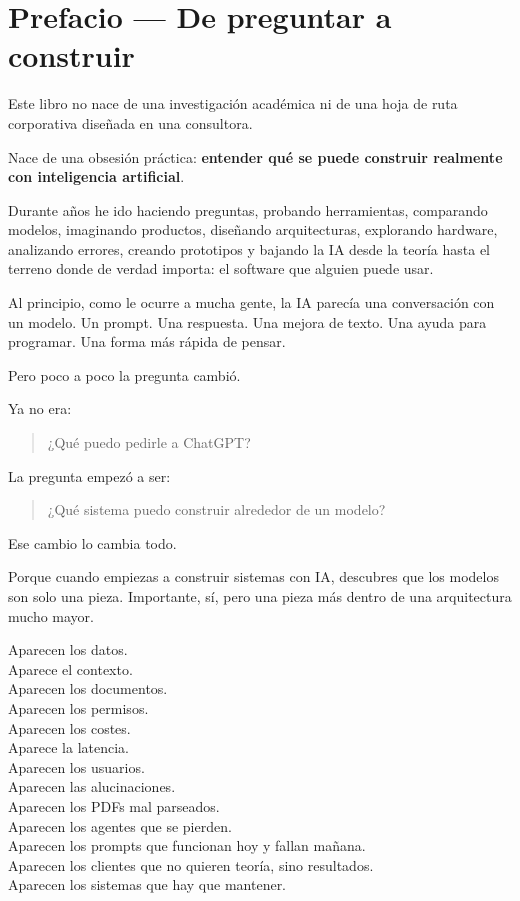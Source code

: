 \chapter{Prefacio --- De preguntar a
construir}\label{prefacio-de-preguntar-a-construir}

Este libro no nace de una investigación académica ni de una hoja de ruta
corporativa diseñada en una consultora.

Nace de una obsesión práctica: \textbf{entender qué se puede construir
realmente con inteligencia artificial}.

Durante años he ido haciendo preguntas, probando herramientas,
comparando modelos, imaginando productos, diseñando arquitecturas,
explorando hardware, analizando errores, creando prototipos y bajando la
IA desde la teoría hasta el terreno donde de verdad importa: el software
que alguien puede usar.

Al principio, como le ocurre a mucha gente, la IA parecía una
conversación con un modelo. Un prompt. Una respuesta. Una mejora de
texto. Una ayuda para programar. Una forma más rápida de pensar.

Pero poco a poco la pregunta cambió.

Ya no era:

\begin{quote}
¿Qué puedo pedirle a ChatGPT?
\end{quote}

La pregunta empezó a ser:

\begin{quote}
¿Qué sistema puedo construir alrededor de un modelo?
\end{quote}

Ese cambio lo cambia todo.

Porque cuando empiezas a construir sistemas con IA, descubres que los
modelos son solo una pieza. Importante, sí, pero una pieza más dentro de
una arquitectura mucho mayor.

Aparecen los datos.\\
Aparece el contexto.\\
Aparecen los documentos.\\
Aparecen los permisos.\\
Aparecen los costes.\\
Aparece la latencia.\\
Aparecen los usuarios.\\
Aparecen las alucinaciones.\\
Aparecen los PDFs mal parseados.\\
Aparecen los agentes que se pierden.\\
Aparecen los prompts que funcionan hoy y fallan mañana.\\
Aparecen los clientes que no quieren teoría, sino resultados.\\
Aparecen los sistemas que hay que mantener.

